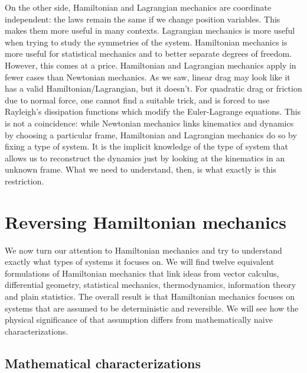 On the other side, Hamiltonian and Lagrangian mechanics are coordinate independent: the laws remain the same if we change position variables. This makes them more useful in many contexts. Lagrangian mechanics is more useful when trying to study the symmetries of the system. Hamiltonian mechanics is more useful for statistical mechanics and to better separate degrees of freedom. However, this comes at a price. Hamiltonian and Lagrangian mechanics apply in fewer cases than Newtonian mechanics. As we saw, linear drag may look like it has a valid Hamiltonian/Lagrangian, but it doesn't. For quadratic drag or friction due to normal force, one cannot find a suitable trick, and is forced to use Rayleigh’s dissipation functions which modify the Euler-Lagrange equations. This is not a coincidence: while Newtonian mechanics links kinematics and dynamics by choosing a particular frame, Hamiltonian and Lagrangian mechanics do so by fixing a type of system. It is the implicit knowledge of the type of system that allows us to reconstruct the dynamics just by looking at the kinematics in an unknown frame. What we need to understand, then, is what exactly is this restriction.

\section{Reversing Hamiltonian mechanics}

We now turn our attention to Hamiltonian mechanics and try to understand exactly what types of systems it focuses on. We will find twelve equivalent formulations of Hamiltonian mechanics that link ideas from vector calculus, differential geometry, statistical mechanics, thermodynamics, information theory and plain statistics. The overall result is that Hamiltonian mechanics focuses on systems that are assumed to be deterministic and reversible. We will see how the physical significance of that assumption differs from mathematically naive characterizations.

\subsection{Mathematical characterizations}


